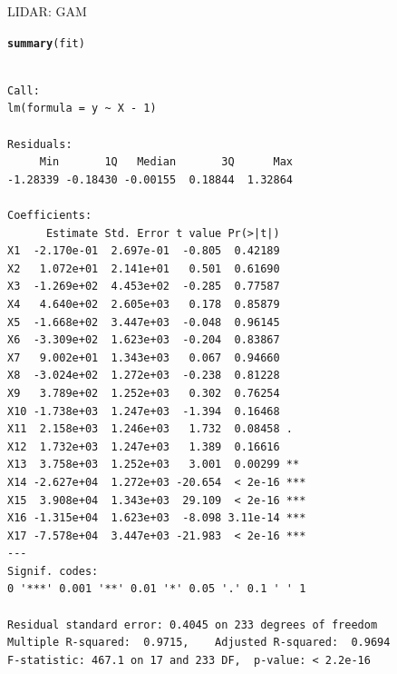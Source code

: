 \documentclass{beamer}\usepackage[]{graphicx}\usepackage[]{color}
\makeatletter
\newcommand{\hlstd}[1]{\textcolor[rgb]{0.345,0.345,0.345}{#1}}%
\newcommand{\hlkwd}[1]{\textcolor[rgb]{0.737,0.353,0.396}{\textbf{#1}}}%
\newenvironment{kframe}{%
 \def\at@end@of@kframe{}%
 \ifinner\ifhmode%
  \def\at@end@of@kframe{\end{minipage}}%
  \begin{minipage}{\columnwidth}%
 \fi\fi%
 \def\FrameCommand##1{\hskip\@totalleftmargin \hskip-\fboxsep
 \colorbox{shadecolor}{##1}\hskip-\fboxsep
     \hskip-\linewidth \hskip-\@totalleftmargin \hskip\columnwidth}%
 \MakeFramed {\advance\hsize-\width
   \@totalleftmargin\z@ \linewidth\hsize
   \@setminipage}}%
 {\par\unskip\endMakeFramed%
 \at@end@of@kframe}
\newenvironment{knitrout}{}{} %
\makeatother
\begin{document}
\begin{frame}[fragile]{LIDAR: GAM}

\begin{center}
\begin{tiny}
\begin{knitrout}
\color{fgcolor}\begin{kframe}
\begin{alltt}
\hlkwd{summary}\hlstd{(fit)}
\end{alltt}
\begin{verbatim}

Call:
lm(formula = y ~ X - 1)

Residuals:
     Min       1Q   Median       3Q      Max 
-1.28339 -0.18430 -0.00155  0.18844  1.32864 

Coefficients:
      Estimate Std. Error t value Pr(>|t|)    
X1  -2.170e-01  2.697e-01  -0.805  0.42189    
X2   1.072e+01  2.141e+01   0.501  0.61690    
X3  -1.269e+02  4.453e+02  -0.285  0.77587    
X4   4.640e+02  2.605e+03   0.178  0.85879    
X5  -1.668e+02  3.447e+03  -0.048  0.96145    
X6  -3.309e+02  1.623e+03  -0.204  0.83867    
X7   9.002e+01  1.343e+03   0.067  0.94660    
X8  -3.024e+02  1.272e+03  -0.238  0.81228    
X9   3.789e+02  1.252e+03   0.302  0.76254    
X10 -1.738e+03  1.247e+03  -1.394  0.16468    
X11  2.158e+03  1.246e+03   1.732  0.08458 .  
X12  1.732e+03  1.247e+03   1.389  0.16616    
X13  3.758e+03  1.252e+03   3.001  0.00299 ** 
X14 -2.627e+04  1.272e+03 -20.654  < 2e-16 ***
X15  3.908e+04  1.343e+03  29.109  < 2e-16 ***
X16 -1.315e+04  1.623e+03  -8.098 3.11e-14 ***
X17 -7.578e+04  3.447e+03 -21.983  < 2e-16 ***
---
Signif. codes:  
0 '***' 0.001 '**' 0.01 '*' 0.05 '.' 0.1 ' ' 1

Residual standard error: 0.4045 on 233 degrees of freedom
Multiple R-squared:  0.9715,	Adjusted R-squared:  0.9694 
F-statistic: 467.1 on 17 and 233 DF,  p-value: < 2.2e-16
\end{verbatim}
\end{kframe}
\end{knitrout}
\end{tiny}
\end{center}

\end{frame}
\end{document}

